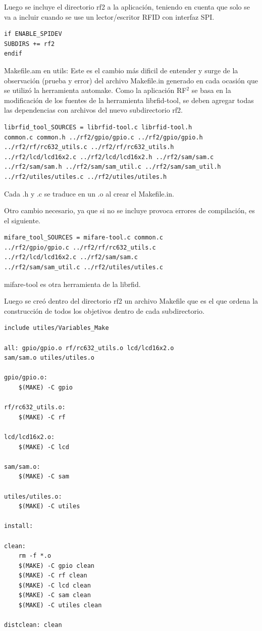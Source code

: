 \bigskip
Luego se incluye el directorio rf2 a la aplicación, teniendo en cuenta que solo se va a incluir cuando se use un lector/escritor RFID con interfaz SPI.
\begin{verbatim}
if ENABLE_SPIDEV 
SUBDIRS += rf2 
endif
\end{verbatim}

Makefile.am en utils:
Este es el cambio más dificil de entender y surge de la observación (prueba y error) del archivo Makefile.in generado en cada ocasión que se utilizó la herramienta automake. Como la aplicación RF$^{2}$ se basa en la modificación de los fuentes de la herramienta librfid-tool, se deben agregar todas las dependencias con archivos del nuevo subdirectorio rf2.

\begin{verbatim}
librfid_tool_SOURCES = librfid-tool.c librfid-tool.h 
common.c common.h ../rf2/gpio/gpio.c ../rf2/gpio/gpio.h 
../rf2/rf/rc632_utils.c ../rf2/rf/rc632_utils.h 
../rf2/lcd/lcd16x2.c ../rf2/lcd/lcd16x2.h ../rf2/sam/sam.c 
../rf2/sam/sam.h ../rf2/sam/sam_util.c ../rf2/sam/sam_util.h 
../rf2/utiles/utiles.c ../rf2/utiles/utiles.h
\end{verbatim}

Cada .h y .c se traduce en un .o al crear el Makefile.in.

\newpage
Otro cambio necesario, ya que si no se incluye provoca errores de compilación, es el siguiente.

\begin{verbatim}
mifare_tool_SOURCES = mifare-tool.c common.c 
../rf2/gpio/gpio.c ../rf2/rf/rc632_utils.c 
../rf2/lcd/lcd16x2.c ../rf2/sam/sam.c 
../rf2/sam/sam_util.c ../rf2/utiles/utiles.c
\end{verbatim}

mifare-tool es otra herramienta de la librfid.

\bigskip
Luego se creó dentro del directorio rf2 un archivo Makefile que es el que ordena la construcción de todos los objetivos dentro de cada subdirectorio.

\begin{verbatim}
include utiles/Variables_Make 

all: gpio/gpio.o rf/rc632_utils.o lcd/lcd16x2.o 
sam/sam.o utiles/utiles.o 

gpio/gpio.o: 
	$(MAKE) -C gpio 

rf/rc632_utils.o: 
	$(MAKE) -C rf 

lcd/lcd16x2.o: 
	$(MAKE) -C lcd 

sam/sam.o: 
	$(MAKE) -C sam 
	 
utiles/utiles.o: 
	$(MAKE) -C utiles 

install: 

clean: 
	rm -f *.o 
	$(MAKE) -C gpio clean 
	$(MAKE) -C rf clean 
	$(MAKE) -C lcd clean 
	$(MAKE) -C sam clean 
	$(MAKE) -C utiles clean 

distclean: clean
\end{verbatim}

